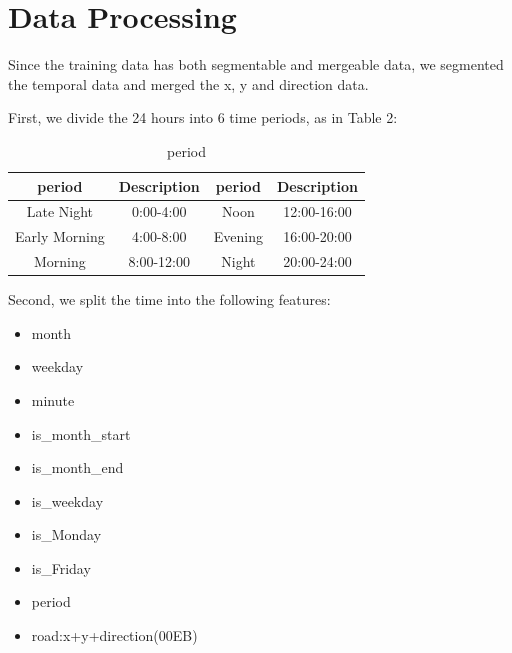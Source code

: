


\section{Data Processing} \label{sec-dataprocess}
Since the training data has both segmentable and mergeable data, we segmented the temporal data and merged the x, y and direction data.\par
First, we divide the 24 hours into 6 time periods, as in Table 2:
\begin{center}
	\begin{table}[htbp]
		\setlength{\abovecaptionskip}{2pt}
		\caption{period}
		\begin{tabular}{ c | c | c | c }
			\toprule
			period    &Description   &  period    &Description      \\
			\midrule
			Late Night     & 0:00-4:00 & Noon     & 12:00-16:00 \\
			\midrule
			Early Morning     & 4:00-8:00 & Evening     & 16:00-20:00 \\
			\midrule
			Morning     & 8:00-12:00 &  Night     & 20:00-24:00 \\
			\bottomrule
		\end{tabular}
	\end{table}
\end{center}\par
Second, we split the time into the following features:
\begin{itemize}
	\setlength{\itemsep}{-0.9ex} 
	\item
	\smallskip  
	month
	\item
	\smallskip
	weekday
	\item
	\smallskip
	minute
	\item
	\smallskip
	is_month_start
	\item
	\smallskip
	is_month_end
	\item
	\smallskip
	is_weekday
	\item
	\smallskip
	is_Monday
	\item
	\smallskip
	is_Friday
	\item
	\smallskip
	period
	\item
	\smallskip
	road:x+y+direction(00EB)
\end{itemize}



